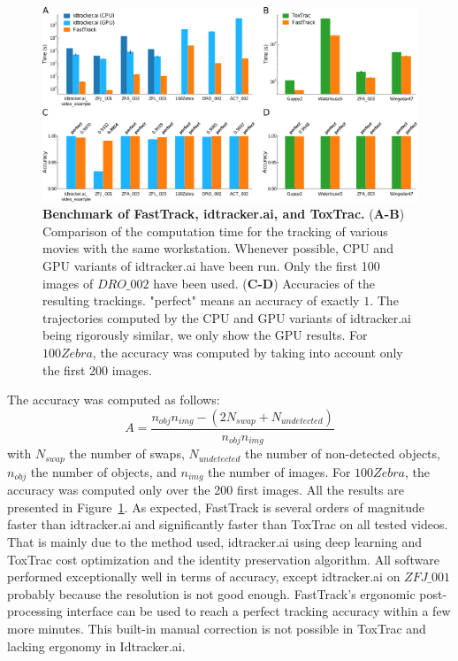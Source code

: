 	\begin{figure}[h!]
    \centering
    \includegraphics[width=\textwidth]{part_1/assets/Figure_benchmark.png}
    \caption{{\bf Benchmark of FastTrack, idtracker.ai, and ToxTrac.}
        (\textbf{A-B}) Comparison of the computation time for the tracking of various movies with the same workstation. Whenever possible, CPU and GPU variants of idtracker.ai have been run. Only the first 100 images of $DRO\_002$ have been used.
        (\textbf{C-D}) Accuracies of the resulting trackings. "perfect" means an accuracy of exactly $1$. The trajectories computed by the CPU and GPU variants of idtracker.ai being rigorously similar, we only show the GPU results. For $100Zebra$, the accuracy was computed by taking into account only the first 200 images.}
    \label{part_1:fig_benchmark}
    \end{figure}

    The accuracy was computed as follows:
    \begin{equation}
     A=\frac{n_{obj}n_{img} - (2N_{swap} + N_{undetected})}{n_{obj}n_{img}}
    \end{equation}
    with $N_{swap}$ the number of swaps, $N_{undetected}$ the number of non-detected objects, $n_{obj}$ the number of objects, and $n_{img}$ the number of images.
    For $100Zebra$, the accuracy was computed only over the 200 first images. All the results are presented in Figure~\ref{part_1:fig_benchmark}. As expected, FastTrack is several orders of magnitude faster than idtracker.ai and significantly faster than ToxTrac on all tested videos. That is mainly due to the method used, idtracker.ai using deep learning and ToxTrac cost optimization and the identity preservation algorithm.
    All software performed exceptionally well in terms of accuracy, except idtracker.ai on $ZFJ\_001$ probably because the resolution is not good enough.
    FastTrack's ergonomic post-processing interface can be used to reach a perfect tracking accuracy within a few more minutes. This built-in manual correction is not possible in ToxTrac and lacking ergonomy in Idtracker.ai.

